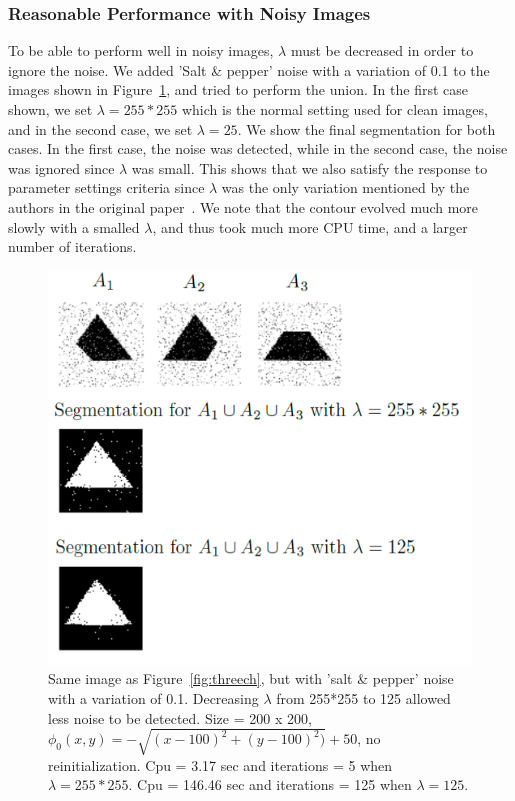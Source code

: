\documentclass[10pt,twocolumn,letterpaper]{article}
\begin{document}
\subsubsection*{Reasonable Performance with Noisy Images}

To be able to perform well in noisy images, $\lambda$ must be decreased in order to ignore the noise. We added 'Salt \& pepper' noise with a variation of 0.1 to
the images shown in Figure~\ref{fig:sc_noisy}, and tried to perform the union. In the first case shown, we set $\lambda = 255*255$ which is the normal setting
used for clean images, and in the second case, we set $\lambda = 25$. We show the final segmentation for both cases. In the first case, the noise was detected,
while in the second case, the noise was ignored since $\lambda$ was small. This shows that we also satisfy the response to parameter settings criteria since
$\lambda$ was the only variation mentioned by the authors in the original paper~\cite{sandberg2005logic}. We note that the contour evolved much more slowly
with a smalled $\lambda$, and thus took much more CPU time, and a larger number of iterations.

\begin{figure}[t]
\centering
\includegraphics[width=12cm]{sc_noisy.png}
\caption{Same image as Figure~\ref{fig:threech}, but with 'salt \& pepper' noise with a variation of 0.1. Decreasing $\lambda$ from 255*255 to 125 allowed less
noise to be detected. Size = 200 x 200, $\phi_{0}(x,y) = - \sqrt{(x - 100)^2 + (y - 100)^2)} +
50$, no reinitialization. Cpu = 3.17 sec and iterations = 5 when $\lambda = 255*255$. Cpu = 146.46 sec and iterations = 125 when $\lambda =
125$.}
\label{fig:sc_noisy}
\end{figure}
\end{document}
